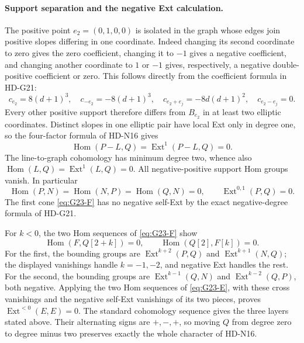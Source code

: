 \paragraph{Support separation and the negative Ext calculation.}
The positive point \(e_2=(0,1,0,0)\) is isolated in the graph
whose edges join positive slopes differing in one coordinate.
Indeed changing its second coordinate to zero gives the zero
coefficient, changing it to \(-1\) gives a negative coefficient,
and changing another coordinate to \(1\) or \(-1\) gives,
respectively, a negative double-positive coefficient or zero.
This follows directly from the coefficient formula in HD-G21:
\[
 c_{e_2}=8(d+1)^3,\quad c_{-e_2}=-8(d+1)^3,\quad
 c_{e_2+e_j}=-8d(d+1)^2,\quad c_{e_2-e_j}=0.
\]
Every other positive support therefore differs from \(B_{e_2}\)
in at least two elliptic coordinates. Distinct slopes in one
elliptic pair have local Ext only in degree one, so the four-factor
formula of HD-N16 gives
\[
 \operatorname{Hom}(P-L,Q)=\operatorname{Ext}^1(P-L,Q)=0.
\]
The line-to-graph cohomology has minimum degree two, whence also
\(\operatorname{Hom}(L,Q)=\operatorname{Ext}^1(L,Q)=0\).
All negative-positive support Hom groups vanish. In particular
\[
 \operatorname{Hom}(P,N)=\operatorname{Hom}(N,P)
     =\operatorname{Hom}(Q,N)=0,
 \qquad \operatorname{Ext}^{0,1}(P,Q)=0.
\]
The first cone \eqref{eq:G23-F} has no negative self-Ext by the
exact negative-degree formula of HD-G21.

For \(k<0\), the two Hom sequences of \eqref{eq:G23-F} show
\[
 \operatorname{Hom}(F,Q[2+k])=0,
 \qquad \operatorname{Hom}(Q[2],F[k])=0.
\]
For the first, the bounding groups are
\(\operatorname{Ext}^{k+2}(P,Q)\) and
\(\operatorname{Ext}^{k+1}(N,Q)\); the displayed vanishings
handle \(k=-1,-2\), and negative Ext handles the rest.
For the second, the bounding groups are
\(\operatorname{Ext}^{k-1}(Q,N)\) and
\(\operatorname{Ext}^{k-2}(Q,P)\), both negative.
Applying the two Hom sequences of \eqref{eq:G23-E}, with these
cross vanishings and the negative self-Ext vanishings of its two
pieces, proves \(\operatorname{Ext}^{<0}(E,E)=0\).
The standard cohomology sequence gives the three layers stated
above. Their alternating signs are \(+,-,+\), so moving \(Q\)
from degree zero to degree minus two preserves exactly the whole
character of HD-N16.

